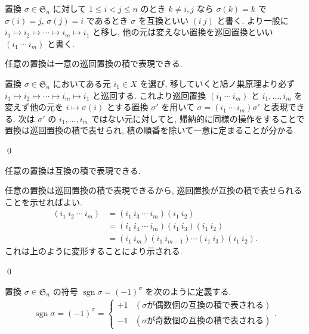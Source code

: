 \documentclass[uplatex,dvipdfmx,a4paper,11pt]{jlreq}
\makeatletter
\DeclareMathOperator{\sgn}{sgn}
\renewcommand{\SS}{\mathfrak{S}}
\numberwithin{equation}{section}
\theoremstyle{definition}
\renewenvironment{proof}[1][\proofname]{\par
  \normalfont
  \topsep6\p@\@plus6\p@ \trivlist
  \item[\hskip\labelsep{\bfseries #1}\@addpunct{\bfseries}]\ignorespaces\quad\par
}{
  \qed\endtrivlist\@endpefalse
}
\renewcommand\proofname{証明}
\makeatother
\begin{document}
\begin{definition}[互換, 巡回置換]
  置換 $\sigma\in\SS_n$ に対して $1\leq i < j\leq n$ のとき $k \neq i,j$ なら $\sigma(k) = k$ で $\sigma(i) = j$, $\sigma(j) = i$ であるとき $\sigma$ を互換といい $(i\ j)$ と書く.
  より一般に $i_1\mapsto i_2\mapsto\cdots\mapsto i_m\mapsto i_1$ と移し, 他の元は変えない置換を巡回置換といい $(i_1\ \cdots\ i_m)$ と書く.
\end{definition}
\begin{lemma}
  任意の置換は一意の巡回置換の積で表現できる.
\end{lemma}
\begin{proof}
  置換 $\sigma\in\SS_n$ においてある元 $i_1\in X$ を選び, 移していくと鳩ノ巣原理より必ず $i_1\mapsto i_2\mapsto\cdots\mapsto i_m\mapsto i_1$ と巡回する. これより巡回置換 $(i_1\ \cdots\ i_m)$ と $i_1,\ldots,i_m$ を変えず他の元を $i\mapsto\sigma(i)$ とする置換 $\sigma'$ を用いて $\sigma = (i_1\ \cdots\ i_m)\sigma'$ と表現できる.
  次は $\sigma'$ の $i_1,\ldots,i_m$ ではない元に対してと, 帰納的に同様の操作をすることで置換は巡回置換の積で表せられ, 積の順番を除いて一意に定まることが分かる.
\end{proof}

\begin{theorem}[Q21-7(i)]
  任意の置換は互換の積で表現できる.
\end{theorem}
\begin{proof}
  任意の置換は巡回置換の積で表現できるから, 巡回置換が互換の積で表せられることを示せればよい.
  \begin{align}
    (i_1\ i_2\ \cdots\ i_m) & = (i_1\ i_3\ \cdots\ i_m)(i_1\ i_2)                   \\
                            & = (i_1\ i_4\ \cdots\ i_m)(i_1\ i_3)(i_1\ i_2)         \\
                            & = (i_1\ i_m)(i_1\ i_{m-1})\cdots(i_1\ i_3)(i_1\ i_2).
  \end{align}
  これは上のように変形することにより示される.
\end{proof}

\begin{definition}[符号]
  置換 $\sigma\in\SS_n$ の符号 $\sgn\sigma = (-1)^\sigma$ を次のように定義する.
  \begin{align}
    \sgn\sigma = (-1)^\sigma = \begin{cases}
                                 +1 & (\sigma が偶数個の互換の積で表される) \\
                                 -1 & (\sigma が奇数個の互換の積で表される)
                               \end{cases}.
  \end{align}
\end{definition}
\end{document}
